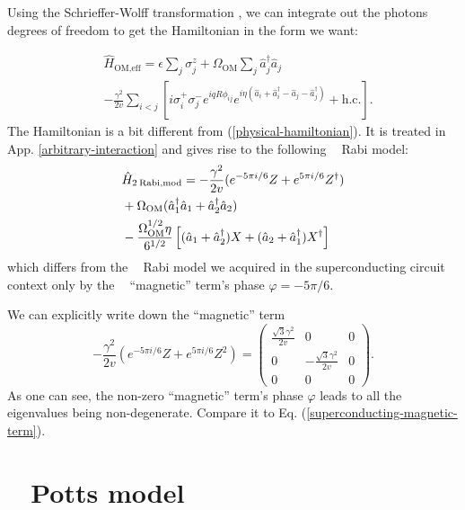 \documentclass[reprint, aps, prx, amsmath, amssymb, longbibliography, superscriptaddress]{revtex4-2}
\DeclareMathOperator{\Zthree}{\mathbb{Z}_3}
\begin{document}
Using the Schrieffer-Wolff transformation \cite{bravyi_schrieffer_2011}, we can integrate out the photons degrees of freedom to get the Hamiltonian in the form we want:

\begin{equation}
\begin{aligned}
&\hat{H}_{\text{OM,eff}}=  \epsilon \sum_j \sigma_j^z + \Omega_{\text{OM}} \sum_j \hat{a}_j^{\dagger} \hat{a}_j \\
& -\frac{\gamma^2}{2v} \sum_{i<j}\left[i \sigma_i^{+} \sigma_j^- e^{i q R \phi_{i j}} e^{i \eta\left(\hat{a}_i+\hat{a}_i^{\dagger}-\hat{a}_j-\hat{a}_j^{\dagger}\right)}+\text {h.c.}\right].
\end{aligned}
\end{equation}
The Hamiltonian is a bit different from (\ref{physical-hamiltonian}). It is treated in App. \ref{arbitrary-interaction} and gives rise to the following $\Zthree$ Rabi model:
\begin{equation}
\begin{aligned}
    &\hat H_{\text{2\:Rabi,mod}}= - \frac{\gamma^2}{2v} (e^{-5\pi i/6} Z + e^{5\pi i/6} Z^{\dagger}) \\
    &+ \Omega_{\text{OM}} (\hat a_1^{\dagger} \hat a_1 + \hat a_2^{\dagger} \hat a_2) \\
    &- \frac{\Omega_{\text{OM}}^{1/2} \eta}{6^{1/2}}\left[(\hat a_1 + \hat a_2^{\dagger}) X  + (\hat a_2 + \hat a_1^{\dagger}) X^{\dagger}  \right]
\end{aligned}
\end{equation}
which differs from the $\Zthree $ Rabi model we acquired in the superconducting circuit context only by the $\Zthree$ ``magnetic'' term's phase $\varphi = - 5\pi/6$.

We can explicitly write down the ``magnetic'' term
\begin{equation}
    - \frac{\gamma^2}{2v} (e^{-5\pi i/6} Z + e^{5\pi i/6} Z^2) = \begin{pmatrix}
        \frac{\sqrt{3}\gamma^2}{2v} & 0 & 0 \\ 0 & -\frac{\sqrt{3}\gamma^2}{2v} & 0 \\ 0 & 0 & 0 
    \end{pmatrix}.
\end{equation}
As one can see, the non-zero ``magnetic'' term's phase $\varphi$ leads to all the eigenvalues being non-degenerate. Compare it to Eq. (\ref{superconducting-magnetic-term}).




\section{\texorpdfstring{$\Zthree$}{Z3} Potts model}
\label{potts-model}
\end{document}
